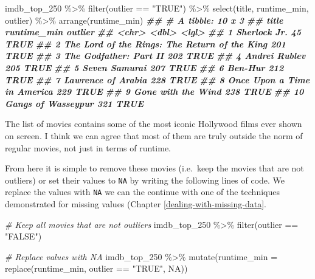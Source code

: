 \documentclass[
]{book}
\newenvironment{Shaded}{\begin{snugshade}}{\end{snugshade}}
\newcommand{\AttributeTok}[1]{\textcolor[rgb]{0.77,0.63,0.00}{#1}}
\newcommand{\CommentTok}[1]{\textcolor[rgb]{0.56,0.35,0.01}{\textit{#1}}}
\newcommand{\ConstantTok}[1]{\textcolor[rgb]{0.00,0.00,0.00}{#1}}
\newcommand{\DocumentationTok}[1]{\textcolor[rgb]{0.56,0.35,0.01}{\textbf{\textit{#1}}}}
\newcommand{\FunctionTok}[1]{\textcolor[rgb]{0.00,0.00,0.00}{#1}}
\newcommand{\NormalTok}[1]{#1}
\newcommand{\SpecialCharTok}[1]{\textcolor[rgb]{0.00,0.00,0.00}{#1}}
\newcommand{\StringTok}[1]{\textcolor[rgb]{0.31,0.60,0.02}{#1}}
\begin{document}
\begin{Shaded}
\begin{Highlighting}[]
\NormalTok{imdb\_top\_250 }\SpecialCharTok{\%\textgreater{}\%} 
  \FunctionTok{filter}\NormalTok{(outlier }\SpecialCharTok{==} \StringTok{"TRUE"}\NormalTok{) }\SpecialCharTok{\%\textgreater{}\%} 
  \FunctionTok{select}\NormalTok{(title, runtime\_min, outlier) }\SpecialCharTok{\%\textgreater{}\%} 
  \FunctionTok{arrange}\NormalTok{(runtime\_min)}
\DocumentationTok{\#\# \# A tibble: 10 x 3}
\DocumentationTok{\#\#    title                                         runtime\_min outlier}
\DocumentationTok{\#\#    \textless{}chr\textgreater{}                                               \textless{}dbl\textgreater{} \textless{}lgl\textgreater{}  }
\DocumentationTok{\#\#  1 Sherlock Jr.                                           45 TRUE   }
\DocumentationTok{\#\#  2 The Lord of the Rings: The Return of the King         201 TRUE   }
\DocumentationTok{\#\#  3 The Godfather: Part II                                202 TRUE   }
\DocumentationTok{\#\#  4 Andrei Rublev                                         205 TRUE   }
\DocumentationTok{\#\#  5 Seven Samurai                                         207 TRUE   }
\DocumentationTok{\#\#  6 Ben{-}Hur                                               212 TRUE   }
\DocumentationTok{\#\#  7 Lawrence of Arabia                                    228 TRUE   }
\DocumentationTok{\#\#  8 Once Upon a Time in America                           229 TRUE   }
\DocumentationTok{\#\#  9 Gone with the Wind                                    238 TRUE   }
\DocumentationTok{\#\# 10 Gangs of Wasseypur                                    321 TRUE}
\end{Highlighting}
\end{Shaded}

The list of movies contains some of the most iconic Hollywood films ever shown on screen. I think we can agree that most of them are truly outside the norm of regular movies, not just in terms of runtime.

From here it is simple to remove these movies (i.e.~keep the movies that are not outliers) or set their values to \texttt{NA} by writing the following lines of code. We replace the values with \texttt{NA} we can the continue with one of the techniques demonstrated for missing values (Chapter \ref{dealing-with-missing-data}.

\begin{Shaded}
\begin{Highlighting}[]
\CommentTok{\# Keep all movies that are not outliers}
\NormalTok{imdb\_top\_250 }\SpecialCharTok{\%\textgreater{}\%} 
  \FunctionTok{filter}\NormalTok{(outlier }\SpecialCharTok{==} \StringTok{"FALSE"}\NormalTok{)}

\CommentTok{\# Replace values with NA}
\NormalTok{imdb\_top\_250 }\SpecialCharTok{\%\textgreater{}\%} 
  \FunctionTok{mutate}\NormalTok{(}\AttributeTok{runtime\_min =} \FunctionTok{replace}\NormalTok{(runtime\_min, outlier }\SpecialCharTok{==} \StringTok{"TRUE"}\NormalTok{, }\ConstantTok{NA}\NormalTok{))}
\end{Highlighting}
\end{Shaded}
\end{document}

